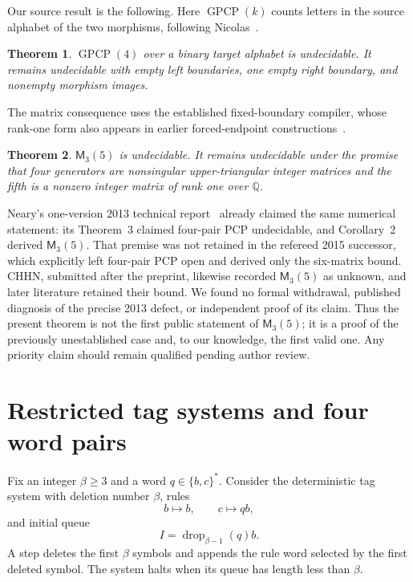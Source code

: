 \documentclass[11pt]{article}
\newtheorem{theorem}{Theorem}[section]
\newcommand{\Mort}{\mathsf{M}}
\newcommand{\Q}{\mathbb Q}
\begin{document}
Our source result is the following.  Here $\operatorname{GPCP}(k)$ counts letters in the
source alphabet of the two morphisms, following Nicolas~\cite{Nicolas08}.

\begin{theorem}\label{thm:gpcp}
$\operatorname{GPCP}(4)$ over a binary target alphabet is undecidable.  It remains
undecidable with empty left boundaries, one empty right boundary, and nonempty morphism
images.
\end{theorem}

The matrix consequence uses the established fixed-boundary compiler, whose rank-one form
also appears in earlier forced-endpoint constructions~\cite{HHH07,CHHN14}.

\begin{theorem}\label{thm:main}
$\Mort_3(5)$ is undecidable.  It remains undecidable under the promise that four generators
are nonsingular upper-triangular integer matrices and the fifth is a nonzero integer matrix
of rank one over $\Q$.
\end{theorem}

Neary's one-version 2013 technical report~\cite{Neary13} already claimed the same numerical
statement: its Theorem~3 claimed four-pair PCP undecidable, and Corollary~2 derived
$\Mort_3(5)$.  That premise was not retained in the refereed 2015 successor, which explicitly
left four-pair PCP open and derived only the six-matrix bound.  CHHN, submitted after the
preprint, likewise recorded $\Mort_3(5)$ as unknown, and later literature retained their
bound.  We found no formal withdrawal, published diagnosis of the precise 2013 defect, or
independent proof of its claim.  Thus the present theorem is not the first public statement of
$\Mort_3(5)$; it is a proof of the previously unestablished case and, to our knowledge, the
first valid one.  Any priority claim should remain qualified pending author review.

\section{Restricted tag systems and four word pairs}

Fix an integer $\beta\geq3$ and a word $q\in\{b,c\}^*$.  Consider the deterministic tag
system with deletion number $\beta$, rules
\[
  b\longmapsto b,\qquad c\longmapsto qb,
\]
and initial queue
\[
  I=\operatorname{drop}_{\beta-1}(q)b.
\]
A step deletes the first $\beta$ symbols and appends the rule word selected by the first
deleted symbol.  The system halts when its queue has length less than $\beta$.
\end{document}
